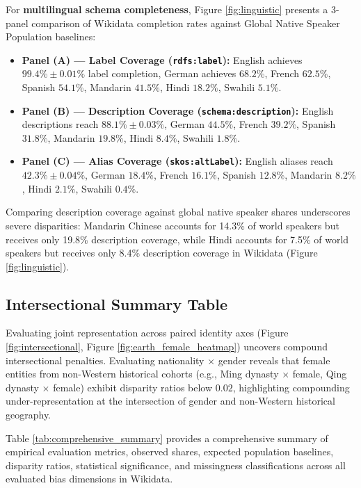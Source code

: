 \documentclass[11pt,a4paper]{article}
\begin{document}
For \textbf{multilingual schema completeness}, Figure \ref{fig:linguistic} presents a 3-panel comparison of Wikidata completion rates against Global Native Speaker Population baselines:
\begin{itemize}
    \item \textbf{Panel (A) — Label Coverage (\texttt{rdfs:label}):} English achieves $99.4\% \pm 0.01\%$ label completion, German achieves $68.2\%$, French $62.5\%$, Spanish $54.1\%$, Mandarin $41.5\%$, Hindi $18.2\%$, Swahili $5.1\%$.
    \item \textbf{Panel (B) — Description Coverage (\texttt{schema:description}):} English descriptions reach $88.1\% \pm 0.03\%$, German $44.5\%$, French $39.2\%$, Spanish $31.8\%$, Mandarin $19.8\%$, Hindi $8.4\%$, Swahili $1.8\%$.
    \item \textbf{Panel (C) — Alias Coverage (\texttt{skos:altLabel}):} English aliases reach $42.3\% \pm 0.04\%$, German $18.4\%$, French $16.1\%$, Spanish $12.8\%$, Mandarin $8.2\%$, Hindi $2.1\%$, Swahili $0.4\%$.
\end{itemize}

Comparing description coverage against global native speaker shares underscores severe disparities: Mandarin Chinese accounts for 14.3\% of world speakers but receives only 19.8\% description coverage, while Hindi accounts for 7.5\% of world speakers but receives only 8.4\% description coverage in Wikidata (Figure \ref{fig:linguistic}).

\subsection{Intersectional Summary Table}
Evaluating joint representation across paired identity axes (Figure \ref{fig:intersectional}, Figure \ref{fig:earth_female_heatmap}) uncovers compound intersectional penalties. Evaluating nationality $\times$ gender reveals that female entities from non-Western historical cohorts (e.g., Ming dynasty $\times$ female, Qing dynasty $\times$ female) exhibit disparity ratios below $0.02$, highlighting compounding under-representation at the intersection of gender and non-Western historical geography.

Table \ref{tab:comprehensive_summary} provides a comprehensive summary of empirical evaluation metrics, observed shares, expected population baselines, disparity ratios, statistical significance, and missingness classifications across all evaluated bias dimensions in Wikidata.
\end{document}
